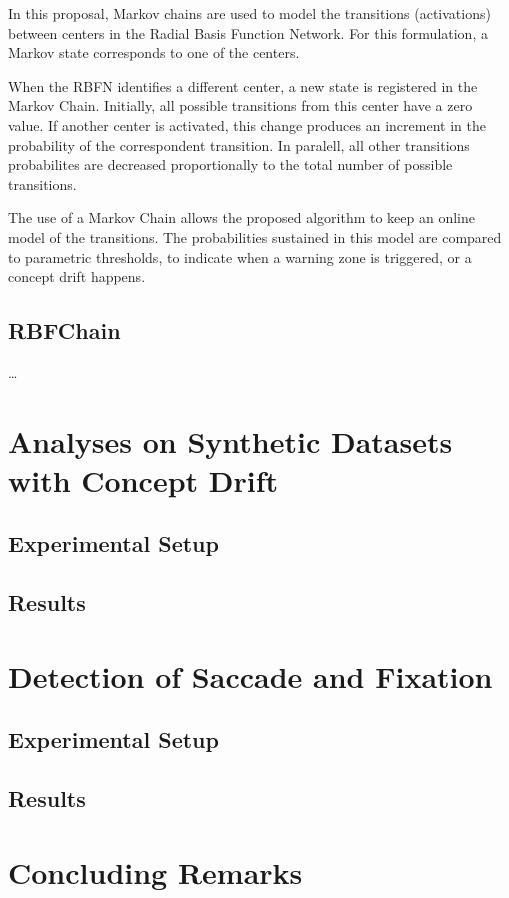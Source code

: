 \documentclass[preprint,12pt]{elsarticle}
\begin{document}
In this proposal, Markov chains are used to model the transitions (activations) between centers in the Radial Basis Function Network.
For this formulation, a Markov state corresponds to one of the centers.

When the RBFN identifies a different center, a new state is registered in the Markov Chain.
Initially, all possible transitions from this center have a zero value.
If another center is activated, this change produces an increment in the probability of the correspondent transition.
In paralell, all other transitions probabilites are decreased proportionally to the total number of possible transitions.

The use of a Markov Chain allows the proposed algorithm to keep an online model of the transitions. The probabilities sustained in this model are compared to parametric thresholds, to indicate when a warning zone is triggered, or a concept drift happens.

\subsection{RBFChain}

\ldots

\section{Analyses on Synthetic Datasets with Concept Drift}
\label{sec:results_synthetic_dataset}

\subsection{Experimental Setup}

\subsection{Results}

\section{Detection of Saccade and Fixation}
\label{sec:detection_of_saccade_and_fixation}

\subsection{Experimental Setup}

\subsection{Results}

\section{Concluding Remarks}



\end{document}
